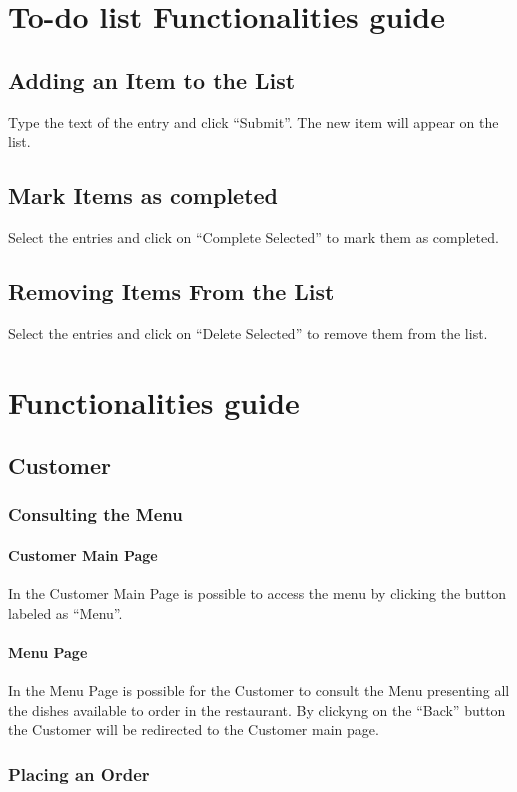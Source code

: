 \section{To-do list Functionalities guide}
\subsection{Adding an Item to the List}
Type the text of the entry and click ``Submit''. The new item will appear on the list.
\subsection{Mark Items as completed}
Select the entries and click on ``Complete Selected'' to mark them as completed. 
\subsection{Removing Items From the List}
Select the entries and click on ``Delete Selected'' to remove them from the list.

\section{\DemoName{} Functionalities guide}
\subsection{Customer}
\subsubsection{Consulting the Menu}
\paragraph{Customer Main Page}
In the Customer Main Page is possible to access the menu by clicking the button labeled as ``Menu''.
\paragraph{Menu Page }
In the Menu Page is possible for the Customer to consult the Menu presenting all the dishes available to order in the restaurant.
By clickyng on the ``Back'' button the Customer will be redirected to the Customer main page.

\subsubsection{Placing an Order}
